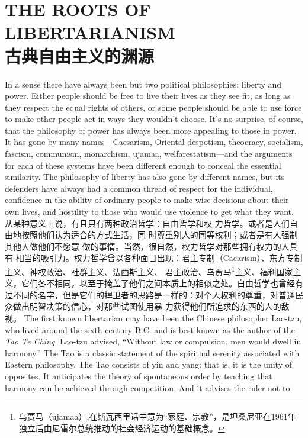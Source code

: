 \chapter{THE ROOTS OF LIBERTARIANISM\\古典自由主义的渊源}
\begin{paracol}{2}

In a sense there have always been but two political
philosophies: liberty and power. Either people should
be free to live their lives as they see fit, as long as they respect
the equal rights of others, or some people should be able to use
force to make other people act in ways they wouldn't choose.
It's no surprise, of course, that the philosophy of power has always been more appealing to those in power. It has gone by many names---Caesarism, Oriental despotism, theocracy, socialism, fascism, communism, monarchism, ujamaa, welfarestatism---and the arguments for each of these systems have
been different enough to conceal the essential similarity. The
philosophy of liberty has also gone by different names, but its
defenders have always had a common thread of respect for the
individual, confidence in the ability of ordinary people to make
wise decisions about their own lives, and hostility to those who
would use violence to get what they want.
\switchcolumn
从某种意义上说，有且只有两种政治哲学：自由哲学和权
力哲学。或者是人们自由地按照他们认为适合的方式生活，同
时尊重别人的同等权利；或者是有人强制其他人做他们不愿意
做的事情。当然，很自然，权力哲学对那些拥有权力的人具有
相当的吸引力。权力哲学曾以各种面目出现：君主专制（Caearism）、东方专制主义、神权政治、社群主义、法西斯主义、
君主政治、乌贾马\footnote{乌贾马（ujamaa）,在斯瓦西里话中意为“家庭、宗教”，是坦桑尼亚在1961年独立后由尼雷尔总统推动的社会经济运动的基础概念。}主义、福利国家主义，它们各不相同，以至于掩盖了他们之间本质上的相似之处。自由哲学也曾经有过不同的名字，但是它们的捍卫者的思路是一样的：对个人权利的尊重，对普通民众做出明智决策的信心，对那些试图使用暴
力获得他们所追求的东西的人的敌视。
\switchcolumn*
The first known libertarian may have been the Chinese
philosopher Lao-tzu, who lived around the sixth century B.C.
and is best known as the author of the \textit{Tao Te Ching}. Lao-tzu advised, ``Without law or compulsion, men would dwell in harmony.'' The Tao is a classic statement of the spiritual serenity
associated with Eastern philosophy. The Tao consists of yin and
yang; that is, it is the unity of opposites. It anticipates the theory of spontaneous order by teaching that harmony can be achieved through competition. And it advises the ruler not to

\end{paracol}
